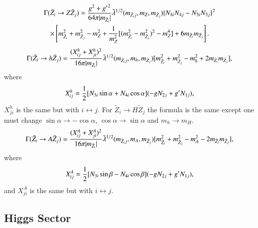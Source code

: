 \documentclass[final,3p,times]{elsarticle}
\begin{document}
\begin{multline}\label{neutZneut}
\Gamma (\tilde{Z}_i \rightarrow Z \tilde{Z}_{j}) = {g^2 + {g'}^2 \over 64\pi |m_{\tilde{Z}_i}|} \tilde{\lambda}^{1/2} (m_{\tilde{Z}_ij}, m_{Z}, m_{\tilde{Z}_{j}}) \{N_{4i}N_{4j} - N_{3i}N_{3j}\}^2 \\ \times \left[m_{\tilde{Z}_{i}}^2 + m_{\tilde{Z}_j}^2 -m_{Z}^2 +{1 \over m_Z^2}[(m_{\tilde{Z}_i}^2 - m_{\tilde{Z}_j}^2)^2 - m_Z^4] + 6m_{\tilde{Z}_i}m_{\tilde{Z}_j}\right].
\end{multline} 
\begin{equation}\label{neuthneut}
\Gamma (\tilde{Z}_i \rightarrow h \tilde{Z}_{j}) = {(X_{ij}^{h} + X_{ji}^{h})^2 \over 16\pi |m_{\tilde{Z}_i}|} \tilde{\lambda}^{1/2} (m_{\tilde{Z}_ij}, m_{h}, m_{\tilde{Z}_{j}}) [m_{\tilde{Z}_{i}}^2 + m_{\tilde{Z}_j}^2 -m_{h}^2 +2m_{\tilde{Z}_i}m_{\tilde{Z}_j}],
\end{equation} 
where
\begin{equation} \label{Xijh}
X_{ij}^{h} = {1 \over 2} [N_{3i} \sin \alpha + N_{4i}\cos \alpha] (-g N_{2j} + g' N_{1j}),
\end{equation}
$X_{ji}^{h}$ is the same but with $i \leftrightarrow j$.
For $\tilde{Z}_i \rightarrow H \tilde{Z}_j$ the formula is the same except one must change $\sin\alpha \rightarrow -\cos\alpha$, $\cos\alpha \rightarrow \sin\alpha$ and $m_h \rightarrow m_H$.
\begin{equation}\label{neutAneut}
\Gamma (\tilde{Z}_i \rightarrow A \tilde{Z}_{j}) = {(X_{ij}^{A} + X_{ji}^{A})^2 \over 16\pi |m_{\tilde{Z}_i}|} \tilde{\lambda}^{1/2} (m_{\tilde{Z}_ij}, m_{A}, m_{\tilde{Z}_{j}}) [m_{\tilde{Z}_{i}}^2 + m_{\tilde{Z}_j}^2 -m_{A}^2 -2m_{\tilde{Z}_i}m_{\tilde{Z}_j}],
\end{equation} 
where
\begin{equation} \label{XijA}
X_{ij}^{A} = {1 \over 2} [N_{3i} \sin \beta - N_{4i} \cos \beta] (-gN_{2j} + g'N_{1j}),
\end{equation}
and $X_{ji}^{A}$ is the same but with $i \leftrightarrow j$.

\subsection{Higgs Sector} \label{Higgs_Sector}
\end{document}
